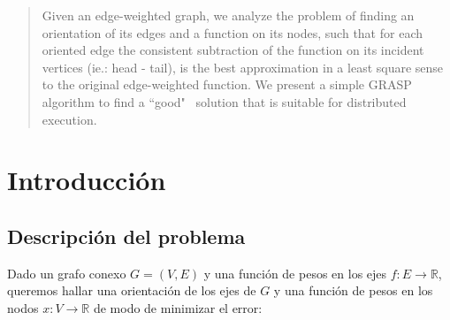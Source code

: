 \documentclass[conference,compsoc,a4paper]{IEEEtran}
\begin{document}



\maketitle


\renewcommand\abstractname{Abstract}

\begin{abstract}

Given an edge-weighted graph, we analyze the problem of finding an 
orientation of its edges and a function on its nodes, such that 
for each oriented edge the consistent subtraction of the function on 
its incident vertices (ie.: head - tail), is the best approximation in 
a least square sense to the original edge-weighted function. We 
present a simple GRASP algorithm to find a ``good" \ solution that is 
suitable for distributed execution.

\end{abstract}





%
\IEEEpeerreviewmaketitle



\section{Introducción}
\subsection{Descripción del problema}

Dado un grafo conexo $G=(V,E)$ \cite{Harari:1969} y una función 
de pesos en los ejes $f: E \rightarrow \mathbb{R}$, queremos hallar 
una orientación de los ejes de $G$ y una función de pesos en los 
nodos $x: V \rightarrow \mathbb{R}$ de modo 
de minimizar el error:
\end{document}
